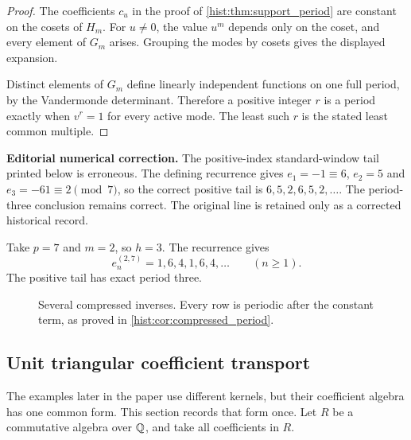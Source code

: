 \begin{proof}
The coefficients \(c_u\) in the proof of \cref{hist:thm:support_period} are constant on the cosets of \(H_m\). For \(u\neq0\), the value \(u^m\) depends only on the coset, and every element of \(G_m\) arises. Grouping the modes by cosets gives the displayed expansion.

Distinct elements of \(G_m\) define linearly independent functions on one full period, by the Vandermonde determinant. Therefore a positive integer \(r\) is a period exactly when \(v^r=1\) for every active mode. The least such \(r\) is the stated least common multiple.
\end{proof}

\begin{histexample}\label{hist:ex:compressed_mod_seven}
\par\noindent\textbf{Editorial numerical correction.} The positive-index standard-window tail printed below is erroneous. The defining recurrence gives $e_1=-1\equiv6$, $e_2=5$ and $e_3=-61\equiv2\pmod7$, so the correct positive tail is $6,5,2,6,5,2,\ldots$. The period-three conclusion remains correct. The original line is retained only as a corrected historical record.\par\medskip
Take \(p=7\) and \(m=2\), so \(h=3\). The recurrence gives
\[
e_n^{(2,7)}
=
1,6,4,1,6,4,\ldots
\qquad(n\geq1).
\]
The positive tail has exact period three.
\end{histexample}

\begin{figure}[t]
\centering
{}
\caption{Several compressed inverses. Every row is periodic after the constant term, as proved in \cref{hist:cor:compressed_period}.}
\label{hist:fig:standard_periods}
\end{figure}


\subsection{Unit triangular coefficient transport}\label{hist:sec:triangular_transport}

The examples later in the paper use different kernels, but their coefficient algebra has one common form. This section records that form once. Let \(R\) be a commutative algebra over \(\mathbb Q\), and take all coefficients in \(R\).

